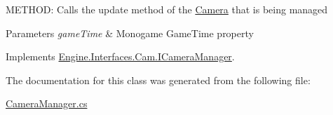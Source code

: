 M\+E\+T\+H\+OD\+: Calls the update method of the \hyperlink{a00490}{Camera} that is being managed 


\begin{DoxyParams}{Parameters}
{\em game\+Time} & Monogame Game\+Time property\\
\hline
\end{DoxyParams}


Implements \hyperlink{a00422_a78a46559249e70181100daff38ef5d6a}{Engine.\+Interfaces.\+Cam.\+I\+Camera\+Manager}.



The documentation for this class was generated from the following file\+:\begin{DoxyCompactItemize}
\item 
\hyperlink{a00152}{Camera\+Manager.\+cs}\end{DoxyCompactItemize}
